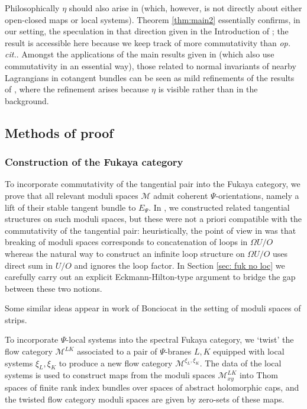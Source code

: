 \documentclass{TPmod}
\newcommand{\cM}{\mathcal{M}}
\numberwithin{equation}{section}
\begin{document}
\begin{rmk}
    Philosophically $\eta$ should also arise in \cite{AAGCKarxiv} (which, however, is not directly about either open-closed maps or local systems). Theorem \ref{thm:main2} essentially confirms, in our setting, the speculation in that direction given in the Introduction of \cite{AAGCKarxiv}; the result is accessible here because we keep track of more commutativity than  \emph{op. cit.}.  Amongst the applications of the main results given in \cite{PS4} (which also use commutativity in an essential way), those related to normal invariants of nearby Lagrangians in cotangent bundles can be seen as mild refinements of the results of \cite{AAGCKarxiv}, where the refinement arises because $\eta$ is visible rather than in the background.
\end{rmk}

\subsection{Methods of proof}

\subsubsection*{Construction of the Fukaya category}
    To incorporate commutativity of the tangential pair into the Fukaya category, we prove that all relevant moduli spaces $\cM$ admit coherent $\Psi$-orientations, namely a lift of their stable tangent bundle to $E_\Psi$. In \cite{PS2}, we constructed related tangential structures on such moduli spaces, but these were not a priori compatible with the commutativity of the tangential pair: heuristically, the point of view in \cite{PS2} was that breaking of moduli spaces corresponds to concatenation of loops in $\Omega U/O$ whereas the natural way to construct an infinite loop structure on $\Omega U/O$ uses direct sum in $U/O$ and ignores the loop factor. In Section \ref{sec: fuk no loc} we carefully carry out an explicit Eckmann-Hilton-type argument to bridge the gap between these two notions.
    
    Some similar ideas appear in work of Bonciocat \cite{Bonciocat} in the setting of moduli spaces of strips.
    
    
 To incorporate $\Psi$-local systems into the spectral Fukaya category, we `twist' the flow category $\cM^{LK}$ associated to a pair of $\Psi$-branes $L, K$ equipped with local systems $\xi_L, \xi_K$ to produce a new flow category $\cM^{\xi_L,\xi_K}$. The data of the local systems is used to construct maps from the moduli spaces $\cM^{LK}_{xy}$ into Thom spaces of finite rank index bundles over spaces of abstract holomorphic caps, and the twisted flow category moduli spaces are given by zero-sets of these maps. 
\end{document}
